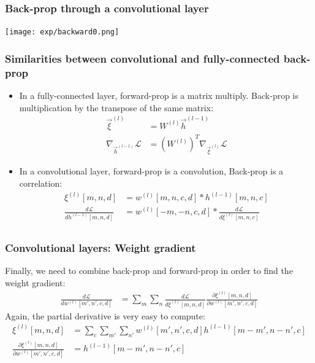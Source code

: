 \documentclass{beamer}
\begin{document}
\begin{frame}
  \frametitle{Back-prop through a convolutional layer}

  \centerline{\texttt{[image: exp/backward0.png]}}
\end{frame}

\begin{frame}
  \frametitle{Similarities between convolutional and fully-connected back-prop}

  \begin{itemize}
  \item In a fully-connected layer, forward-prop is a matrix multiply.
    Back-prop is multiplication by the transpose of the same matrix:
    \begin{align*}
      \vec{\xi}^{(l)} &= W^{(l)}\vec{h}^{(l-1)}\\
      \nabla_{\vec{h}^{(l-1)}}{\mathcal L} &= \left(W^{(l)}\right)^T\nabla_{\vec{\xi}^{(l)}}{\mathcal L}
    \end{align*}
  \item In a convolutional layer, forward-prop is a convolution,
    Back-prop is a correlation:
    \begin{align*}
    \xi^{(l)}[m,n,d] &= w^{(l)}[m,n,c,d] \ast h^{(l-1)}[m,n,c]\\
    \frac{d{\mathcal L}}{dh^{(l-1)}[m,n,d]} &=
    w^{(l)}[-m,-n,c,d] \ast \frac{d{\mathcal L}}{d\xi^{(l)}[m,n,c]}\\
    \end{align*}
  \end{itemize}
\end{frame}
    
\begin{frame}
  \frametitle{Convolutional layers: Weight gradient}

  Finally, we need to combine back-prop and forward-prop in order to
  find  the weight gradient:
  \begin{align*}
    \frac{d{\mathcal L}}{dw^{(l)}[m',n',c,d]} &=
    \sum_{m}\sum_n\frac{d{\mathcal L}}{d\xi^{(l)}[m,n,d]}
    \frac{\partial\xi^{(l)}[m,n,d]}{\partial w^{(l)}[m',n',c,d]}
  \end{align*}
  Again, the partial derivative is very easy to compute:
  \begin{align*}
    \xi^{(l)}[m,n,d] &= \sum_c\sum_{m'}\sum_{n'} w^{(l)}[m',n',c,d]h^{(l-1)}[m-m',n-n',c]\\
    \frac{\partial\xi^{(l)}[m,n,d]}{\partial w^{(l)}[m',n',c,d]} &= h^{(l-1)}[m-m',n-n',c]
  \end{align*}
\end{frame}
\end{document}
